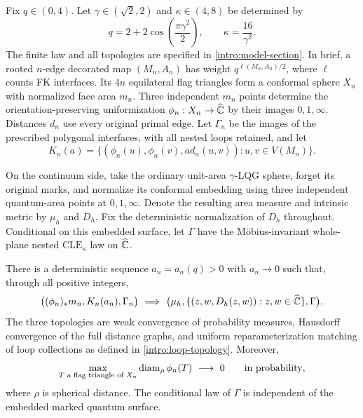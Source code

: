 Fix $q\in(0,4)$. Let $\gamma\in(\sqrt2,2)$ and $\kappa\in(4,8)$ be
determined by
\begin{equation}\label{intro:parameters}
 q=2+2\cos\!\left(\frac{\pi\gamma^2}{2}\right),
 \qquad \kappa=\frac{16}{\gamma^2}.
\end{equation}
The finite law and all topologies are specified in
\cref{intro:model-section}. In brief, a rooted $n$-edge decorated map
$(M_n,A_n)$ has weight $q^{\ell(M_n,A_n)/2}$, where $\ell$ counts FK
interfaces. Its $4n$ equilateral flag triangles form a conformal sphere
$X_n$ with normalized face area $m_n$. Three independent $m_n$ points
determine the orientation-preserving uniformization
$\phi_n:X_n\to\widehat{\mathbb C}$ by their images $0,1,\infty$.
Distances $d_n$ use every original primal edge. Let $\Gamma_n$ be the
images of the prescribed polygonal interfaces, with all nested loops
retained, and let
\begin{equation}\label{intro:distance-graph}
 K_n(a)=\{(\phi_n(u),\phi_n(v),a d_n(u,v)):u,v\in V(M_n)\}.
\end{equation}

On the continuum side, take the ordinary unit-area $\gamma$-LQG sphere,
forget its original marks, and normalize its conformal embedding using
three independent quantum-area points at $0,1,\infty$. Denote the
resulting area measure and intrinsic metric by $\mu_h$ and $D_h$.
Fix the deterministic normalization of $D_h$ throughout. Conditional on
this embedded surface, let $\Gamma$ have the M\"obius-invariant whole-plane
nested $\mathrm{CLE}_{\kappa}$ law on $\widehat{\mathbb C}$.

\begin{theorem}\label{intro:main}
There is a deterministic sequence
$a_n=a_n(q)>0$ with $a_n\to0$ such that, through all positive integers,
\begin{equation}\label{intro:joint-convergence}
 \big((\phi_n)_*m_n,K_n(a_n),\Gamma_n\big)
 \ \Longrightarrow\
 \big(\mu_h,\{(z,w,D_h(z,w)):z,w\in\Chat\},\Gamma\big).
\end{equation}
The three topologies are weak convergence of probability measures,
Hausdorff convergence of the full distance graphs, and uniform
reparameterization matching of loop collections as defined in
\cref{intro:loop-topology}. Moreover,
\begin{equation}\label{intro:mesh-conclusion}
 \max_{T\text{ a flag triangle of }X_n}
       \diam_{\rho}\phi_n(T)\ \longrightarrow\ 0
 \qquad\text{in probability},
\end{equation}
where $\rho$ is spherical distance. The conditional law of $\Gamma$ is
independent of the embedded marked quantum surface.
\end{theorem}

